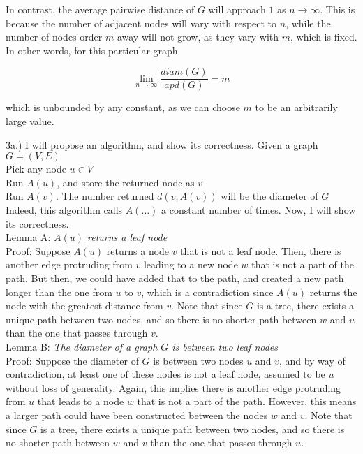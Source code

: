 \documentclass[12pt]{article}
\begin{document}
In contrast, the average pairwise distance of $G$ will approach $1$ as $n \rightarrow \infty$. This is because the number of adjacent nodes will vary with respect to $n$, while the number of nodes order $m$ away will not grow, as they vary with $m$, which is fixed. In other words, for this particular graph

$$\lim_{n \rightarrow \infty} \frac{diam(G)}{apd(G)} = m$$

which is unbounded by any constant, as we can choose $m$ to be an arbitrarily large value.
\pagebreak

3a.) I will propose an algorithm, and show its correctness. Given a graph $G = (V, E)$\\

Pick any node $u \in V$\\
Run $A(u)$, and store the returned node as $v$\\
Run $A(v)$. The number returned $d(v, A(v))$ will be the diameter of $G$\\

Indeed, this algorithm calls $A( \dots )$ a constant number of times. Now, I will show its correctness.\\

Lemma A: \emph{$A(u)$ returns a leaf node}\\
Proof: Suppose $A(u)$ returns a node $v$ that is not a leaf node. Then, there is another edge protruding from $v$ leading to a new node $w$ that is not a part of the path. But then, we could have added that to the path, and created a new path longer than the one from $u$ to $v$, which is a contradiction since $A(u)$ returns the node with the greatest distance from $v$. Note that since $G$ is a tree, there exists a unique path between two nodes, and so there is no shorter path between $w$ and $u$ than the one that passes through $v$.\\

Lemma B: \emph{The diameter of a graph $G$ is between two leaf nodes}\\ 
Proof: Suppose the diameter of $G$ is between two nodes $u$ and $v$, and by way of contradiction, at least one of these nodes is not a leaf node, assumed to be $u$ without loss of generality. Again, this implies there is another edge protruding from $u$ that leads to a node $w$ that is not a part of the path. However, this means a larger path could have been constructed between the nodes $w$ and $v$. Note that since $G$ is a tree, there exists a unique path between two nodes, and so there is no shorter path between $w$ and $v$ than the one that passes through $u$.\\
\end{document}
